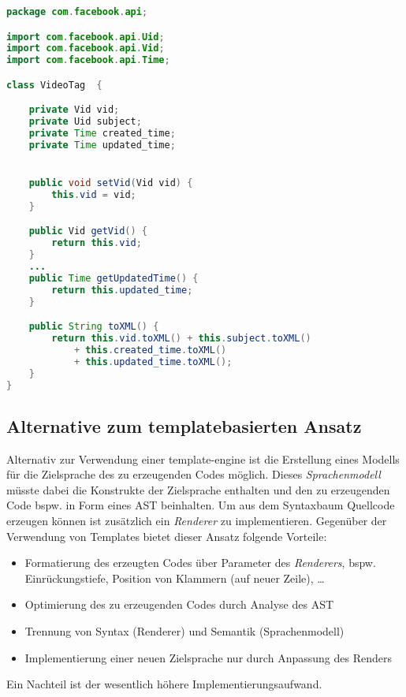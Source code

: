 \begin{lstlisting}[language=Java, label=lst:javaExample, caption=Beispiel für eine generierte Java-Datei (getter und setter gekürzt)]
package com.facebook.api;

import com.facebook.api.Uid;
import com.facebook.api.Vid;
import com.facebook.api.Time;

class VideoTag  {

    private Vid vid;
    private Uid subject;
    private Time created_time;
    private Time updated_time;


    public void setVid(Vid vid) {
        this.vid = vid;
    }

    public Vid getVid() {
        return this.vid;
    }
    ...
    public Time getUpdatedTime() {
        return this.updated_time;
    }

    public String toXML() {
        return this.vid.toXML() + this.subject.toXML()
            + this.created_time.toXML()
            + this.updated_time.toXML();
    }
}
\end{lstlisting}

\subsection{Alternative zum templatebasierten Ansatz}

Alternativ zur Verwendung einer \gls{template-engine} ist die Erstellung eines Modells für die Zielsprache des zu erzeugenden Codes möglich. Dieses \emph{Sprachenmodell} müsste dabei die Konstrukte der Zielsprache enthalten und den zu erzeugenden Code bspw. in Form eines \gls{AST} beinhalten.
Um aus dem Syntaxbaum Quellcode erzeugen können ist zusätzlich ein \emph{Renderer} zu implementieren. Gegenüber der Verwendung von Templates bietet dieser Ansatz folgende Vorteile:

\begin{itemize}
    \item Formatierung des erzeugten Codes über Parameter des \emph{Renderers}, bspw. Einrückungstiefe, Position von Klammern (auf neuer Zeile), \ldots
    \item Optimierung des zu erzeugenden Codes durch Analyse des \gls{AST}
    \item Trennung von Syntax (Renderer) und Semantik (Sprachenmodell)
    \item Implementierung einer neuen Zielsprache nur durch Anpassung des Renders
\end{itemize}

Ein Nachteil ist der wesentlich höhere Implementierungsaufwand.

